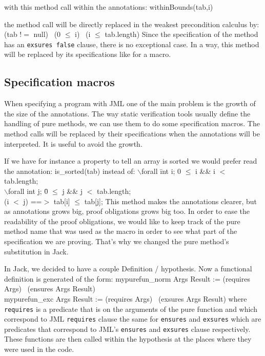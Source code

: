 with this method call within the annotations: 
\btab
withinBounds(tab,i)
\etab

the method call will be directly replaced in the weakest precondition calculus by:
\btab
(tab $!=$ null) \rarrow \ (0 $\le$ i) \conj \ (i $\le$ tab.length)
\etab
Since the specification
of the method has an {\tt exsures false} clause, there is no exceptional case.
In a way, this method will be replaced by its specifications like for a macro.



\subsection{Specification macros}


When specifying a program with JML one of the main problem is the 
growth of the size of the annotations. 
The way static verification tools usually define the handling 
of pure methods, we can use them to do some specification macros.
The method calls will be replaced by their specifications when the 
annotations will be interpreted. It is useful to avoid the growth.

If we have for instance a property to tell an array is sorted we would 
prefer read the annotation:
\btab
is\_sorted(tab)
\etab
instead of:
\btab
 $\backslash$forall \=int i; 0 $\le$ i \&\& i $<$ tab.length;\+\\ 
 $\backslash$forall int j; \=0 $\le$ j \&\& j $<$ tab.length; \+\\(i $<$ j) ==$>$ tab[i] $\le$ tab[j];
\etab
This method makes the annotations clearer, but as annotations 
grows big, proof obligations grows big too. In order to ease the readability 
of the proof obligations, we would like to keep track of the pure method name
that was used as the macro in order to see what part of the specification we 
are proving. That's why we changed the pure method's substitution in Jack.

In Jack, we decided to have a couple Definition / hypothesis.
Now a functional definition is generated of the form:
\btab
mypurefun\_norm  Args Result := (requires Args) \rarrow \ (ensures Args Result)\\
mypurefun\_exc  Args Result := (requires Args) \rarrow \ (exsures Args Result)
\etab
where {\tt requires} is a predicate that is on the arguments of the pure function and 
which correspond to JML {\tt requires} clause the same for {\tt ensures} and {\tt exsures} 
which are predicates that correspond to JML's {\tt ensures} and {\tt exsures} clause respectively.
These functions are then called within the hypothesis at the places where they were used in the code. 

